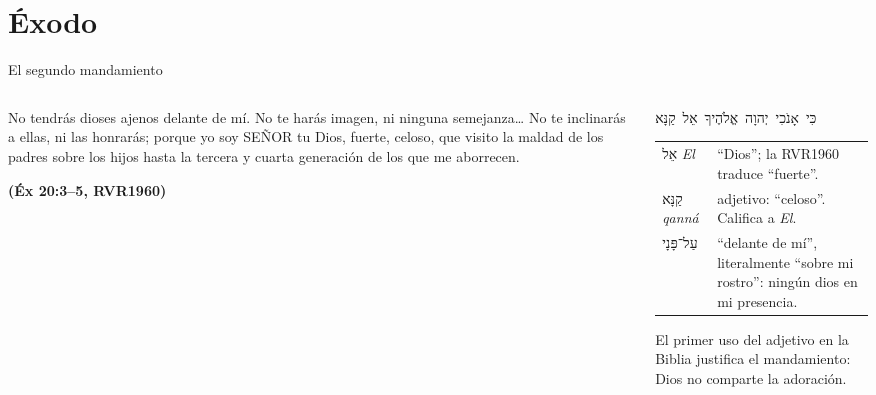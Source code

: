 \documentclass[hyperref={bookmarks=false},aspectratio=169]{beamer}
\newcommand{\heb}[1]{\mbox{\foreignlanguage{hebrew}{#1}}}
\newcommand{\SENOR}{S{\fontsize{0.78em}{1em}\selectfont EÑOR}}
\newcommand{\fuente}[1]{\par\hfill{\upshape\bfseries\footnotesize\textcolor{azul}{#1}}}
\begin{document}
\section{Éxodo}

\begin{frame}{El segundo mandamiento}
\begin{columns}[c,onlytextwidth]
\begin{column}{0.52\textwidth}
\begin{cita}No tendrás dioses ajenos delante de mí. No te harás imagen, ni ninguna semejanza\ldots{} No te inclinarás a ellas, ni las honrarás; porque yo soy \SENOR{} tu Dios, fuerte, celoso, que visito la maldad de los padres sobre los hijos hasta la tercera y cuarta generación de los que me aborrecen.\fuente{(Éx 20:3--5, RVR1960)}\end{cita}
\end{column}
\begin{column}{0.46\textwidth}
\begin{center}\heb{כִּי אָנֹכִי יְהוָה אֱלֹהֶיךָ אֵל קַנָּא}\end{center}
\scriptsize\renewcommand{\arraystretch}{1.15}
\begin{tabular}{@{}>{\RaggedRight\arraybackslash}p{1.9cm}>{\RaggedRight\arraybackslash}p{3.7cm}@{}}
\toprule
\heb{אֵל} \emph{El} & ``Dios''; la RVR1960 traduce ``fuerte''. \\
\heb{קַנָּא} \emph{qanná} & adjetivo: ``celoso''. Califica a \emph{El}. \\
\heb{עַל־פָּנָי} & ``delante de mí'', literalmente ``sobre mi rostro'': ningún dios en mi presencia. \\
\bottomrule
\end{tabular}\par\smallskip
\small El primer uso del adjetivo en la Biblia justifica el mandamiento: Dios no comparte la adoración.
\end{column}
\end{columns}
\end{frame}
\end{document}
